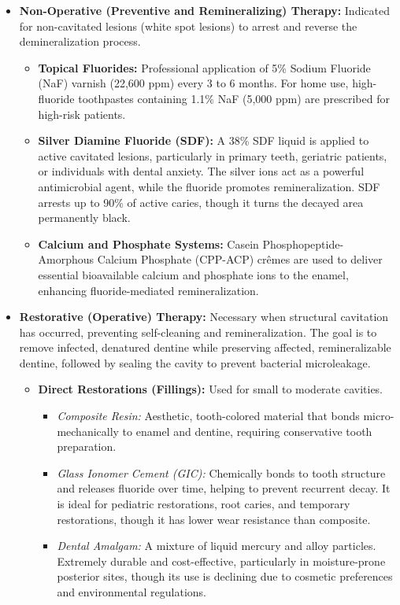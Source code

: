 \begin{itemize}
    \item \textbf{Non-Operative (Preventive and Remineralizing) Therapy:} Indicated for non-cavitated lesions (white spot lesions) to arrest and reverse the demineralization process.
    \begin{itemize}
        \item \textbf{Topical Fluorides:} Professional application of 5\% Sodium Fluoride (NaF) varnish (22,600 ppm) every 3 to 6 months. For home use, high-fluoride toothpastes containing 1.1\% NaF (5,000 ppm) are prescribed for high-risk patients.
        \item \textbf{Silver Diamine Fluoride (SDF):} A 38\% SDF liquid is applied to active cavitated lesions, particularly in primary teeth, geriatric patients, or individuals with dental anxiety. The silver ions act as a powerful antimicrobial agent, while the fluoride promotes remineralization. SDF arrests up to 90\% of active caries, though it turns the decayed area permanently black.
        \item \textbf{Calcium and Phosphate Systems:} Casein Phosphopeptide-Amorphous Calcium Phosphate (CPP-ACP) cr\^{e}mes are used to deliver essential bioavailable calcium and phosphate ions to the enamel, enhancing fluoride-mediated remineralization.
    \end{itemize}
    \item \textbf{Restorative (Operative) Therapy:} Necessary when structural cavitation has occurred, preventing self-cleaning and remineralization. The goal is to remove infected, denatured dentine while preserving affected, remineralizable dentine, followed by sealing the cavity to prevent bacterial microleakage.
    \begin{itemize}
        \item \textbf{Direct Restorations (Fillings):} Used for small to moderate cavities.
        \begin{itemize}
            \item \textit{Composite Resin:} Aesthetic, tooth-colored material that bonds micro-mechanically to enamel and dentine, requiring conservative tooth preparation.
            \item \textit{Glass Ionomer Cement (GIC):} Chemically bonds to tooth structure and releases fluoride over time, helping to prevent recurrent decay. It is ideal for pediatric restorations, root caries, and temporary restorations, though it has lower wear resistance than composite.
            \item \textit{Dental Amalgam:} A mixture of liquid mercury and alloy particles. Extremely durable and cost-effective, particularly in moisture-prone posterior sites, though its use is declining due to cosmetic preferences and environmental regulations.

\end{itemize}
\end{itemize}
\end{itemize}
